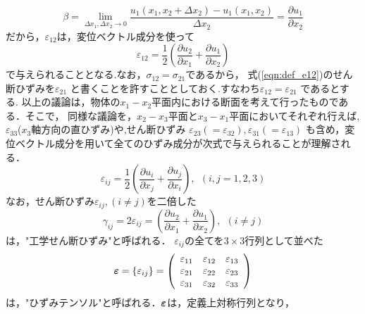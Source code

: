 \documentclass[10pt,a4j]{jarticle}
\begin{document}
\begin{equation}
	\beta=
	\lim_{\Delta x_1,\Delta x_2 \rightarrow 0}
	\frac{u_1(x_1,x_2+\Delta x_2)-u_1(x_1,x_2)}{\Delta x_2}
	=\frac{\partial u_1}{\partial x_2}
	\label{eqn:alpha}
\end{equation}
だから，$\varepsilon_{12}$は，変位ベクトル成分を使って
\begin{equation}
	\varepsilon_{12}=\frac{1}{2}
	\left(
	\frac{\partial u_2}{\partial x_1}
	+
	\frac{\partial u_1}{\partial x_2}
	\right)
	\label{eqn:def_e12}
\end{equation}
で与えられることとなる.なお，$\sigma_{12}=\sigma_{21}$であるから，
式(\ref{eqn:def_e12})のせん断ひずみを$\varepsilon_{21}$
と書くことを許すこととしておく.すなわち$\varepsilon_{12}=\varepsilon_{21}$
であるとする.
以上の議論は，物体の$x_1-x_2$平面内における断面を考えて行ったものである．そこで，
同様な議論を，$x_2-x_3$平面と$x_3-x_1$平面においてそれぞれ行えば,
$\varepsilon_{33}$($x_3$軸方向の直ひずみ)や,せん断ひずみ
$\varepsilon_{23}(=\varepsilon_{32}), \varepsilon_{31}(=\varepsilon_{13})$
も含め，変位ベクトル成分を用いて全てのひずみ成分が次式で与えられることが理解される．
\begin{equation}
	\varepsilon_{ij}=\frac{1}{2}
	\left(
	\frac{\partial u_i}{\partial x_j}
	+
	\frac{\partial u_j}{\partial x_i}
	\right), \ \ (i,j=1,2,3)
	\label{eqn:def_eij}
\end{equation}
なお，せん断ひずみ$\varepsilon_{ij},(i\neq j)$を二倍した
\begin{equation}
	\gamma_{ij}=2\varepsilon_{ij}
	=
	\left(
	\frac{\partial u_2}{\partial x_1}
	+
	\frac{\partial u_1}{\partial x_2}
	\right), \ \ (i\neq j)
	\label{eqn:def_g12}
\end{equation}
は，"工学せん断ひずみ"と呼ばれる．
$\varepsilon_{ij}$の全てを$3\times 3$行列として並べた
\begin{equation}
	\mbox{\boldmath $\varepsilon$}=\left\{ \varepsilon_{ij}\right\}
	=\left(
	\begin{array}{ccc}
		\varepsilon_{11} & \varepsilon_{12} & \varepsilon_{13}\\
		\varepsilon_{21} & \varepsilon_{22} & \varepsilon_{23}\\
		\varepsilon_{31} & \varepsilon_{32} & \varepsilon_{33}
	\end{array}
	\right)
	\label{eqn:def_emat}
\end{equation}
は，"ひずみテンソル"と呼ばれる．$\mbox{\boldmath $\varepsilon$}$は，定義上対称行列となり，
\end{document}
